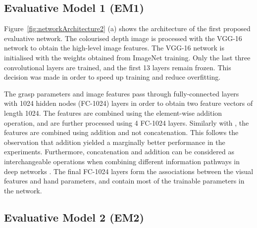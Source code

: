 \subsection{Evaluative Model 1 (EM1)}

Figure~\ref{fig:networkArchitecture2} (a) shows the architecture of the first proposed evaluative network. The colourised depth image is processed with the VGG-16 network \cite{Simonyan14c} to obtain the high-level image features. The VGG-16 network is initialised with the weights obtained from ImageNet training. Only the last three convolutional layers are trained, and the first 13 layers remain frozen. This decision was made in order to speed up training and reduce overfitting.

The grasp parameters and image features pass through fully-connected layers with 1024 hidden nodes (FC-1024) layers in order to obtain two feature vectors of length 1024. The features are combined using the element-wise addition operation, and are further processed using 4 FC-1024 layers. Similarly with \cite{Levine1}, the features are combined using addition and not concatenation. This follows the observation that addition yielded a marginally better performance in the experiments. Furthermore, concatenation and addition can be considered as interchangeable operations when combining different information pathways in deep networks \cite{dumoulin2018feature-wise}. The final FC-1024 layers form the associations between the visual features and hand parameters, and contain most of the trainable parameters in the network. 

\subsection{Evaluative Model 2 (EM2)}


